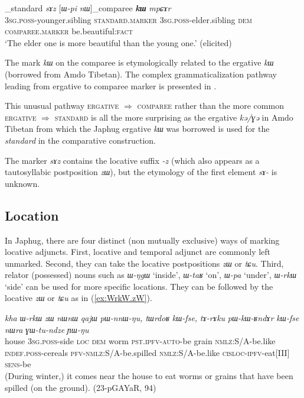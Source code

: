 \documentclass[oneside,a4paper,11pt]{article}
\newcommand{\ipa}[1]{\mbox{\phon\textit{#1}}} %
\begin{document}
\begin{exe}
\ex \label{ex:comp1}
\gll  [\ipa{ɯ-ʁi}]_{standard}   	\ipa{sɤz}   	[\ipa{ɯ-pi}   	\ipa{nɯ}]_{comparee}   	\ipa{\textbf{kɯ}}   	\ipa{mpɕɤr}     \\
\textsc{3sg.poss}-younger.sibling \textsc{standard.marker} \textsc{3sg.poss}-elder.sibling \textsc{dem} \textsc{comparee.marker}  be.beautiful:\textsc{fact} \\
\glt `The elder one is more beautiful than the young one.' (elicited)
\end{exe}

The mark \ipa{kɯ} on the comparee is etymologically related to the ergative \ipa{kɯ} (borrowed from Amdo Tibetan). The complex grammaticalization pathway leading from ergative to comparee marker is presented in \citet{jacques16comparative}. 

This unusual pathway \textsc{ergative} $\Rightarrow$ \textsc{comparee} rather than the more common \textsc{ergative} $\Rightarrow$ \textsc{standard} is all the more surprising as the ergative \ipa{kə/ɣə} in Amdo Tibetan from which the Japhug ergative \ipa{kɯ} was borrowed is used for the \textit{standard} in the comparative construction.

The marker \ipa{sɤz} contains the locative suffix \ipa{-z} (which also appears as a tautosyllabic postposition \ipa{zɯ}), but the etymology of the first element \ipa{sɤ-} is unknown. 

 \subsection{Location}   \label{sec:loc}
In Japhug, there are four distinct (non mutually exclusive) ways of marking locative adjuncts. First, locative and temporal adjunct are commonly left unmarked. Second, they can  take the locative postpositions \ipa{zɯ} or \ipa{tɕu}.  Third, relator (possessed) nouns such as \ipa{ɯ-ŋgɯ} `inside', \ipa{ɯ-taʁ} `on', \ipa{ɯ-pa} `under', \ipa{ɯ-rkɯ} `side' can be used for more specific locations. They can be followed by the locative \ipa{zɯ} or \ipa{tɕu} as in (\ref{ex:WrkW.zW}).

\begin{exe}
\ex \label{ex:WrkW.zW}
\gll \ipa{kha} 	\ipa{ɯ-rkɯ} 	\ipa{zɯ} 	\ipa{nɯnɯ} 	\ipa{qajɯ} 	\ipa{pɯ-nnɯ-ŋu,} 	\ipa{tɯrdoʁ} 	\ipa{kɯ-fse,} 	\ipa{tɤ-rɤku} 	\ipa{pɯ-kɯ-ʁndɤr} 	\ipa{kɯ-fse} 	\ipa{nɯra} 	\ipa{ɣɯ-tu-ndze} 	\ipa{ɲɯ-ŋu} \\
house \textsc{3sg.poss}-side \textsc{loc} \textsc{dem} worm \textsc{pst.ipfv-auto}-be grain \textsc{nmlz}:S/A-be.like \textsc{indef.poss}-cereals \textsc{pfv-nmlz}:S/A-be.spilled \textsc{nmlz}:S/A-be.like \textsc{cisloc-ipfv}-eat[III] \textsc{sens}-be \\
\glt (During winter,) it comes near the house to eat worms or grains that have been spilled (on the ground). (23-pGAYaR, 94)
\end{exe}
\end{document}
